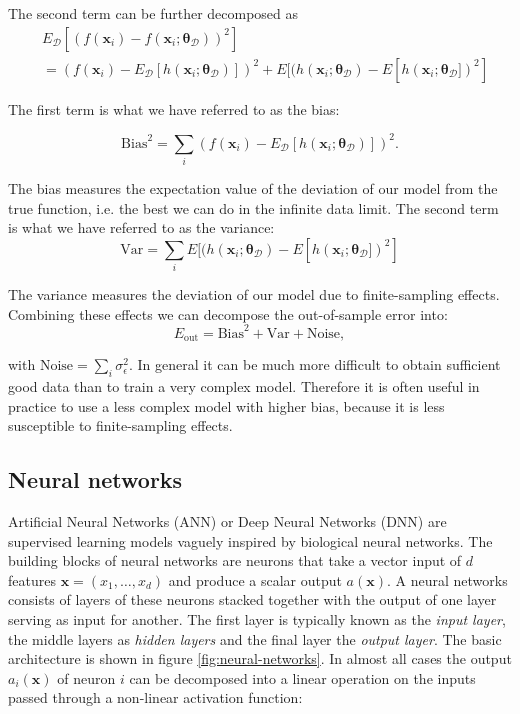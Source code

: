The second term can be further decomposed as
\begin{equation}
\begin{split}
    &E_{\mathcal{D}}[(f(\bm{x}_i) - f(\bm{x}_i ; \bm{\theta}_{\mathcal{D}}))^2] \\
    &= (f(\bm{x}_i) - E_{\mathcal{D}}[h(\bm{x}_i ; \bm{\theta}_{\mathcal{D}})])^2
    + E[(h(\bm{x}_i ; \bm{\theta}_{\mathcal{D}}) - E[h(\bm{x}_i ; \bm{\theta}_{\mathcal{D}}])^2]
\end{split}
\end{equation}

The first term is what we have referred to as the bias:

\begin{equation}
    \text{Bias}^2 = \sum_i (f(\bm{x}_i) - E_{\mathcal{D}}[h(\bm{x}_i ; \bm{\theta}_{\mathcal{D}})])^2.
\end{equation}

The bias measures the expectation value of the deviation of our model from the true
function, i.e. the best we can do in the infinite data limit.
\newline
The second term is what we have referred to as the variance:
\begin{equation}
    \text{Var} = \sum_i  E[(h(\bm{x}_i ; \bm{\theta}_{\mathcal{D}}) - E[h(\bm{x}_i ; \bm{\theta}_{\mathcal{D}}])^2]
\end{equation}

The variance measures the deviation of our model due to finite-sampling effects.
Combining these effects we can decompose the out-of-sample error into:
\begin{equation}
    E_{\text{out}} = \text{Bias}^2 + \text{Var} + \text{Noise},
\end{equation}

with $\text{Noise} = \sum_i \sigma_{\epsilon}^2$.
\newline
In general it can be much more difficult to obtain sufficient good data
than to train a very complex model. Therefore it is often useful in practice
to use a less complex model with higher bias, because it is less susceptible
to finite-sampling effects.

\subsection{Neural networks}
Artificial Neural Networks (ANN) or Deep Neural Networks (DNN) are
supervised learning models vaguely inspired by biological neural networks.
The building blocks of neural networks are neurons that take a
vector input of $d$ features $\bm{x} = (x_1,\dots,x_d)$
and produce a scalar output $a(\bm{x})$.
A neural networks consists of layers of these neurons stacked together
with the output of one layer serving as input for another. The
first layer is typically known as the \textit{input layer}, the
middle layers as \textit{hidden layers} and the final layer
the \textit{output layer}. The basic architecture is shown in
figure \ref{fig:neural-networks}.
In almost all cases the output $a_i(\bm{x})$ of neuron $i$ can be decomposed
into a linear operation on the inputs passed through a non-linear
activation function:

